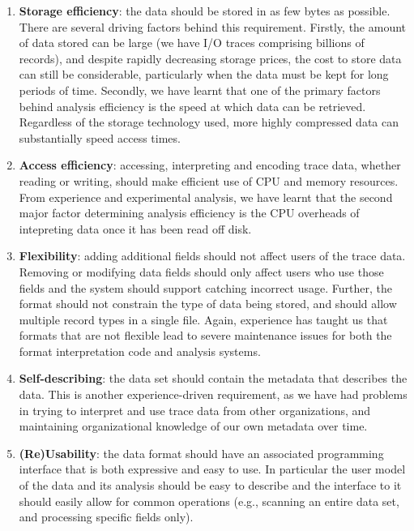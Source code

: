 \documentclass{acm_proc_article-sp}
\begin{document}
\begin{enumerate}

\item \textbf{Storage efficiency}: the data should be stored in as few
bytes as possible. There are several driving factors behind this
requirement. Firstly, the amount of data stored can be large (we have
I/O traces comprising billions of records), and despite rapidly
decreasing storage prices, the cost to store data can still be
considerable, particularly when the data must be kept for long periods
of time. Secondly, we have learnt that one of the primary factors
behind analysis efficiency is the speed at which data can be
retrieved. Regardless of the storage technology used, more highly
compressed data can substantially speed access times.

\item \textbf{Access efficiency}: accessing, interpreting and encoding
trace data, whether reading or writing, should make efficient use of
CPU and memory resources. From experience and experimental analysis, we
have learnt that the second major factor determining analysis efficiency is the
CPU overheads of intepreting data once it has been read off disk. 

\item \textbf{Flexibility}: adding additional fields should not affect
users of the trace data.  Removing or modifying data fields should
only affect users who use those fields and the system should support
catching incorrect usage.  Further, the format should not constrain
the type of data being stored, and should allow multiple record types
in a single file. Again, experience has taught us that formats that
are not flexible lead to severe maintenance issues for both the format
interpretation code and analysis systems.

\item \textbf{Self-describing}: the data set should contain the
metadata that describes the data. This is another experience-driven
requirement, as we have had problems in trying to interpret and use
trace data from other organizations, and maintaining organizational
knowledge of our own metadata over time.

\item \textbf{(Re)Usability}: the data format should have an
associated programming interface that is both expressive and easy to
use. In particular the user model of the data and its analysis should
be easy to describe and the interface to it should easily allow for
common operations (e.g., scanning an entire data set, and processing
specific fields only).

\end{enumerate}
\end{document}
